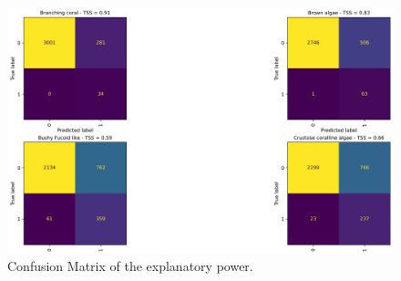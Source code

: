 \begin{figure}
\hypertarget{fig:chap3figS6}{%
\centering
\includegraphics{03-Chapitre3/figures/supplementary/03-confusion_matrix_train_all_a.png}
\caption{Confusion Matrix of the explanatory
power.}\label{fig:chap3figS6}
}
\end{figure}

\newpage

